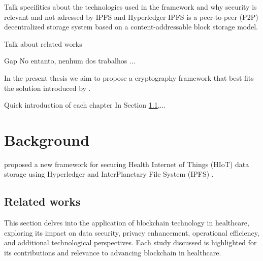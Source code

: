 \documentclass[cic,tc,english]{iiufrgs}
\begin{document}
    \begin{draft}{Talk specifities about the technologies used in the framework and why security is relevant and not adressed by IPFS and Hyperledger}
        IPFS \cite{benet2013ipfs} is a peer-to-peer (P2P) decentralized storage system based on a content-addressable block storage model.
    \end{draft}


    \begin{draft}{Talk about related works}
        
    \end{draft}

    \begin{draft}{Gap}
        No entanto, nenhum dos trabalhos ...
    \end{draft}


    In the present thesis we aim to propose a cryptography framework that best fits the solution introduced by \citet{laura2023}.


    \begin{draft}{Quick introduction of each chapter}
        In Section \ref{relatedworks},...

    \end{draft}


\chapter{Background}
    \label{background}
    \citet{laura2023} proposed a new framework for securing Health Internet of Things (HIoT) data storage using Hyperledger and InterPlanetary File System (IPFS) \cite{benet2013ipfs}.

    \section{Related works}
    \label{relatedworks}


        This section delves into the application of blockchain technology in healthcare, exploring its impact on data security, privacy enhancement, operational efficiency, and additional technological perspectives. Each study discussed is highlighted for its contributions and relevance to advancing blockchain in healthcare.
\end{document}
